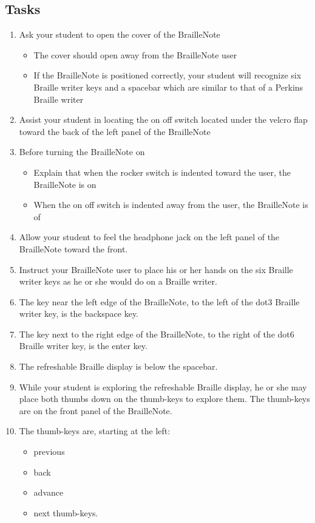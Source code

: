 \documentclass[10pt,letterpaper,twoside]{report}
\begin{document}
{{{\subsection{Tasks}
\begin{enumerate}
	\item Ask your student to open the cover of the BrailleNote
		\begin{itemize}
		\item The cover should open away from the BrailleNote user
		\item If the BrailleNote is positioned correctly, your student will recognize six Braille writer keys and a spacebar which are similar to that of a Perkins Braille writer
		\end{itemize}
	\item Assist your student in locating the on off switch located under the velcro flap toward the back of the left panel of the BrailleNote
	\item Before turning the BrailleNote on 
	    \begin{itemize}
	        \item Explain that when the rocker switch is indented toward the user, the BrailleNote is on 
	        \item When the on off switch is indented away from the user, the BrailleNote is of
	\end{itemize}
	\item Allow your student to feel the headphone jack on the left panel of the BrailleNote toward the front.
	\item Instruct your BrailleNote user to place his or her hands on the six Braille writer keys as he or she would do on a Braille writer. 
	\item The key near the left edge of the BrailleNote, to the left of the dot3 Braille writer key, is the backspace key.
	\item The key next to the right edge of the BrailleNote, to the right of the dot6 Braille writer key, is the enter key. 
	\item The refreshable Braille display is below the spacebar. 
	\item While your student is exploring the refreshable Braille display, he or she may place both thumbs down on the thumb-keys to explore them.  The thumb-keys are on the front panel of the BrailleNote.
	\item The thumb-keys are, starting at the left:
	\begin{itemize}
	    \item previous
	    \item back
	    \item advance
	    \item next thumb-keys.
	\end{itemize}
\end{enumerate}
}}}
\end{document}
